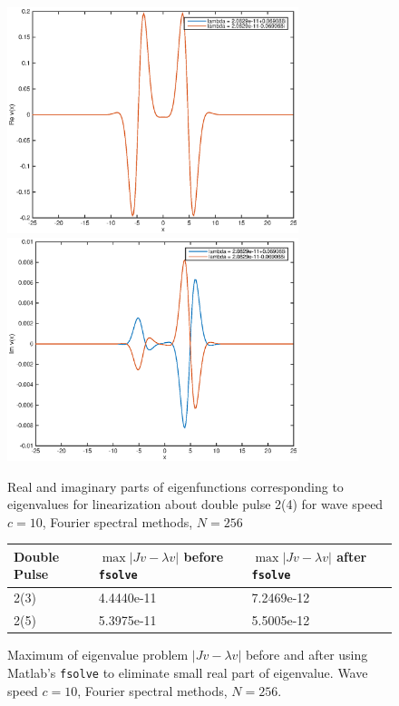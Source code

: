 \documentclass[12pt]{article}
\begin{document}
\begin{figure}[H]
	\includegraphics[width=8.5cm]{four10dp2eigenfnsreal}
	\includegraphics[width=8.5cm]{four10dp2eigenfnsimag}
	\caption{Real and imaginary parts of eigenfunctions corresponding to eigenvalues for linearization about double pulse 2(4) for wave speed $c = 10$, Fourier spectral methods, $N = 256$}
\end{figure}

\begin{figure}[H]
\begin{tabular}{l|ll}
 Double Pulse   & $\max{|Jv - \lambda v|}$ before \texttt{fsolve} & $\max{|Jv - \lambda v|}$ after \texttt{fsolve}\\ \hline
  2(3) & 4.4440e-11 & 7.2469e-12 \\
  2(5) & 5.3975e-11 & 5.5005e-12 \\
\end{tabular}
\caption{Maximum of eigenvalue problem $|Jv - \lambda v|$ before and after using Matlab's \texttt{fsolve} to eliminate small real part of eigenvalue. Wave speed $c = 10$, Fourier spectral methods, $N = 256$.}
\end{figure}
\end{document}
